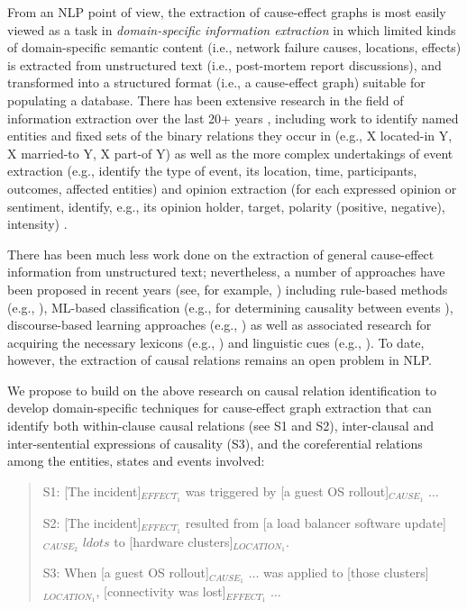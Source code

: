 From an NLP point of view, the extraction of cause-effect graphs is
most easily viewed as a task in {\it domain-specific information
  extraction} in which limited kinds of domain-specific semantic
content (i.e., network failure causes, locations, effects) is
extracted from unstructured text (i.e., post-mortem report {\sc
  discussion}s), and transformed into a structured format (i.e., a
cause-effect graph) suitable for populating a database.  There has
been extensive research in the field of information extraction over
the last 20+ years \cite{[refs]}, including work to identify named
entities \cite{[refs]} and fixed sets of the binary relations they
occur in (e.g., X {\sc located-in} Y, X {\sc married-to} Y, X {\sc
  part-of} Y) \cite{[refs]} as well as the more complex undertakings
of event extraction (e.g., identify the type of event, its location,
time, participants, outcomes, affected entities) \cite{[refs]} and
opinion extraction (for each expressed opinion or sentiment, identify,
e.g., its opinion holder, target, polarity (positive, negative),
intensity) \cite{[refs]}.

There has been much less work done on the extraction of general
cause-effect information from unstructured text; nevertheless, a
number of approaches have been proposed in recent years (see, for
example, \cite{CAtoCL:2014}) including rule-based methods (e.g.,
\cite{bogel-EtAl:2014:CAtoCL}), ML-based classification (e.g., for
determining causality between events
\cite{mirza-tonelli:2014:Coling}), discourse-based learning approaches
(e.g., \cite{oh-EtAl:2013:ACL2013}) as well as associated research for
acquiring the necessary lexicons (e.g.,
\cite{kozareva:2012:TextGraphs-7}) and linguistic cues (e.g.,
\cite{hidey-mckeown:2016:P16-1}).  To date, however, the extraction of
causal relations remains an open problem in NLP.

We propose to build on the above research on causal relation
identification to develop domain-specific techniques for cause-effect
graph extraction that can identify both within-clause causal relations
(see S1 and S2), inter-clausal and inter-sentential expressions of
causality (S3), and the coreferential relations among the
entities, states and events involved:

\begin{quote}
S1: [The incident]$_{EFFECT_1}$ was triggered by [a guest OS
    rollout]$_{CAUSE_1}$ $\ldots$
     
S2: [The incident]$_{EFFECT_1}$ resulted from [a load
    balancer software update]$_{CAUSE_2}$ $ldots$ to [hardware
    clusters]$_{LOCATION_1}$.
       
S3: When [a guest OS rollout]$_{CAUSE_1}$ $\ldots$ was applied to
    [those clusters]$_{LOCATION_1}$, [connectivity was
    lost]$_{EFFECT_1}$ $\ldots$
\end{quote}

